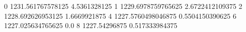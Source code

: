0 1231.561767578125 4.5361328125
1 1229.6978759765625 2.6722412109375
2 1228.692626953125 1.6669921875
4 1227.5760498046875 0.5504150390625
6 1227.025634765625 0.0
8 1227.54296875 0.517333984375
